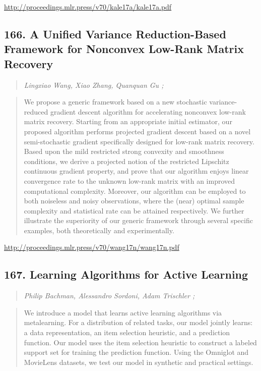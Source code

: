 \documentclass{article}
\begin{document}
\href{http://proceedings.mlr.press/v70/kale17a/kale17a.pdf}{http://proceedings.mlr.press/v70/kale17a/kale17a.pdf}

\subsection{166. A Unified Variance Reduction-Based Framework for Nonconvex Low-Rank Matrix Recovery}

\begin{quote}
\footnotesize{\textit{Lingxiao Wang, Xiao Zhang, Quanquan Gu ;}}
\end{quote}

\begin{quote}
    We propose a generic framework based on a new stochastic variance-reduced gradient descent algorithm for accelerating nonconvex low-rank matrix recovery. Starting from an appropriate initial estimator, our proposed algorithm performs projected gradient descent based on a novel semi-stochastic gradient specifically designed for low-rank matrix recovery. Based upon the mild restricted strong convexity and smoothness conditions, we derive a projected notion of the restricted Lipschitz continuous gradient property, and prove that our algorithm enjoys linear convergence rate to the unknown low-rank matrix with an improved computational complexity. Moreover, our algorithm can be employed to both noiseless and noisy observations, where the (near) optimal sample complexity and statistical rate can be attained respectively. We further illustrate the superiority of our generic framework through several specific examples, both theoretically and experimentally.  \end{quote}

\href{http://proceedings.mlr.press/v70/wang17n/wang17n.pdf}{http://proceedings.mlr.press/v70/wang17n/wang17n.pdf}

\subsection{167. Learning Algorithms for Active Learning}

\begin{quote}
\footnotesize{\textit{Philip Bachman, Alessandro Sordoni, Adam Trischler ;}}
\end{quote}

\begin{quote}
    We introduce a model that learns active learning algorithms via metalearning. For a distribution of related tasks, our model jointly learns: a data representation, an item selection heuristic, and a prediction function. Our model uses the item selection heuristic to construct a labeled support set for training the prediction function. Using the Omniglot and MovieLens datasets, we test our model in synthetic and practical settings.  \end{quote}
\end{document}
